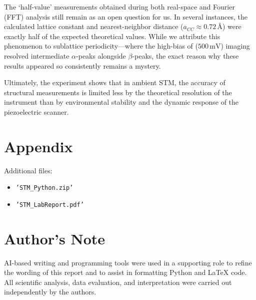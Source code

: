 \documentclass[a4paper]{article}
\begin{document}
The `half-value' measurements obtained during both real-space and Fourier (FFT) analysis still remain as an open question for us. In several instances, the calculated lattice constant and nearest-neighbor distance ($a_{CC} \approx 0.72\,\text{\AA}$) were exactly half of the expected theoretical values. While we attribute this phenomenon to sublattice periodicity—where the high-bias of ($500\,\text{mV}$) imaging resolved intermediate $\alpha$-peaks alongside $\beta$-peaks, the exact reason why these results appeared so consistently remains a mystery.

Ultimately, the experiment shows that in ambient STM, the accuracy of structural measurements is limited less by the theoretical resolution of the instrument than by environmental stability and the dynamic response of the piezoelectric scanner.

\newpage
\section{Appendix}

Additional files:

\begin{itemize}
  \item \texttt{'STM\_Python.zip'}
  \item \texttt{'STM\_LabReport.pdf'}
\end{itemize}

\printbibliography[heading=bibintoc]

\section*{Author's Note}
AI-based writing and programming tools were used in a supporting role to refine the wording of this report and to assist in formatting Python and LaTeX code.
All scientific analysis, data evaluation, and interpretation were carried out independently by the authors.


\newpage

\end{document}
